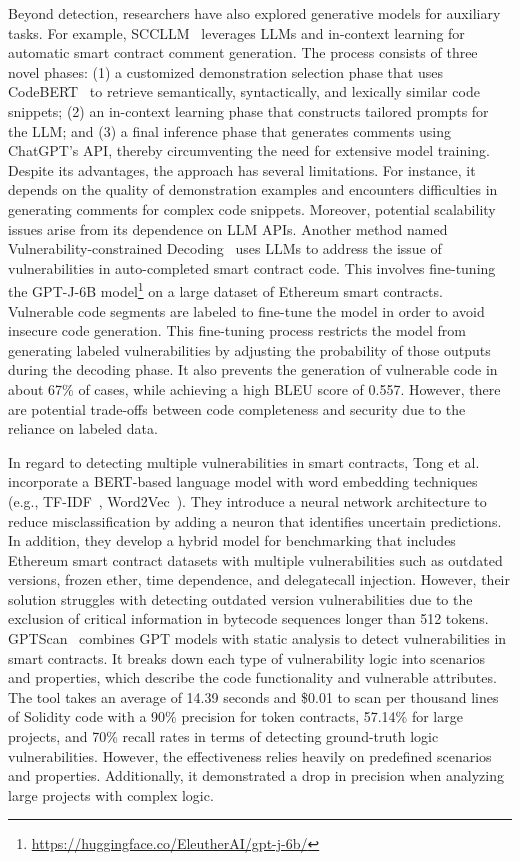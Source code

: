 \documentclass[5p,twocolumn]{elsarticle}
\begin{document}
Beyond detection, researchers have also explored generative models for auxiliary tasks. For example, SCCLLM~\cite{zhao2024automatic} leverages LLMs and in-context learning for automatic smart contract comment generation. The process consists of three novel phases: (1) a customized demonstration selection phase that uses CodeBERT~\cite{feng2020codebert} to retrieve semantically, syntactically, and lexically similar code snippets; (2) an in-context learning phase that constructs tailored prompts for the LLM; and (3) a final inference phase that generates comments using ChatGPT's API, thereby circumventing the need for extensive model training. Despite its advantages, the approach has several limitations. For instance, it depends on the quality of demonstration examples and encounters difficulties in generating comments for complex code snippets. Moreover, potential scalability issues arise from its dependence on LLM APIs. Another method named Vulnerability-constrained Decoding~\cite{storhaug2023efficient} uses LLMs to address the issue of vulnerabilities in auto-completed smart contract code. This involves fine-tuning the GPT-J-6B model\footnote{\url{https://huggingface.co/EleutherAI/gpt-j-6b/}} on a large dataset of Ethereum smart contracts. Vulnerable code segments are labeled to fine-tune the model in order to avoid insecure code generation. This fine-tuning process restricts the model from generating labeled vulnerabilities by adjusting the probability of those outputs during the decoding phase. It also prevents the generation of vulnerable code in about 67\% of cases, while achieving a high BLEU score of 0.557. However, there are potential trade-offs between code completeness and security due to the reliance on labeled data.

In regard to detecting multiple vulnerabilities in smart contracts, Tong et al.~\cite{tong2024enhancing} incorporate a BERT-based language model with word embedding techniques (e.g., TF-IDF~\cite{aizawa2003information}, Word2Vec~\cite{church2017word2vec}). They introduce a neural network architecture to reduce misclassification by adding a neuron that identifies uncertain predictions. In addition, they develop a hybrid model for benchmarking that includes Ethereum smart contract datasets with multiple vulnerabilities such as outdated versions, frozen ether, time dependence, and delegatecall injection. However, their solution struggles with detecting outdated version vulnerabilities due to the exclusion of critical information in bytecode sequences longer than 512 tokens. GPTScan~\cite{sun2024gptscan} combines GPT models with static analysis to detect vulnerabilities in smart contracts. It breaks down each type of vulnerability logic into scenarios and properties, which describe the code functionality and vulnerable attributes. The tool takes an average of 14.39 seconds and \$0.01 to scan per thousand lines of Solidity code with a 90\% precision for token contracts, 57.14\% for large projects, and 70\% recall rates in terms of detecting ground-truth logic vulnerabilities. However, the effectiveness relies heavily on predefined scenarios and properties. Additionally, it demonstrated a drop in precision when analyzing large projects with complex logic.
\end{document}
